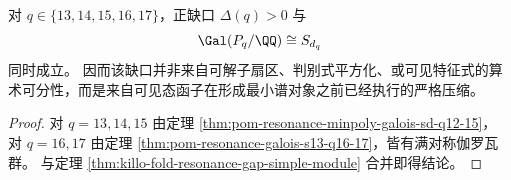 \begin{corollary}[共振缺口不是伽罗瓦退化]\label{cor:killo-fold-resonance-gap-not-galois-degeneracy}
对 \(q\in\{13,14,15,16,17\}\)，正缺口 \(\Delta(q)>0\) 与
\[
\Gal(P_q/\QQ)\cong S_{d_q}
\]
同时成立。
因而该缺口并非来自可解子扇区、判别式平方化、或可见特征式的算术可分性，而是来自可见态函子在形成最小谱对象之前已经执行的严格压缩。
\end{corollary}

\begin{proof}
对 \(q=13,14,15\) 由定理 \ref{thm:pom-resonance-minpoly-galois-sd-q12-15}，
对 \(q=16,17\) 由定理 \ref{thm:pom-resonance-galois-s13-q16-17}，皆有满对称伽罗瓦群。
与定理 \ref{thm:killo-fold-resonance-gap-simple-module} 合并即得结论。
\end{proof}
